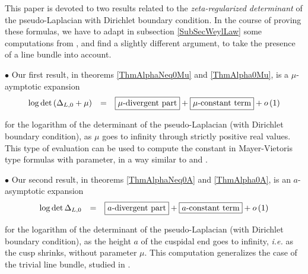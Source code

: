\documentclass{jams-l}
\theoremstyle{definition}
\theoremstyle{remark}
\numberwithin{equation}{section}
\begin{document}
        This paper is devoted to two results related to the \textit{zeta-regularized determinant} of the pseudo-Laplacian with Dirichlet boundary condition. In the course of proving these formulas, we have to adapt in subsection \ref{SubSecWeylLaw} some computations from \cite{MR699488}, and find a slightly different argument, to take the presence of a line bundle into account.
        
        \medskip
        
        \hspace{10pt} $\bullet$ Our first result, in theorems \ref{ThmAlphaNeq0Mu} and \ref{ThmAlpha0Mu}, is a $\mu$-aymptotic expansion
            \begin{equation}
            \label{AsymptoticStudyMu}
                \begin{array}{lll}
                    \log \det \left( \Delta_{L,0} + \mu \right) & = & \fbox{$\mu$-divergent part} + \fbox{$\mu$-constant term} + o \left( 1 \right)
                \end{array}
            \end{equation}
            
            \noindent for the logarithm of the determinant of the pseudo-Laplacian (with Dirichlet boundary condition), as $\mu$ goes to infinity through strictly positive real values. This type of evaluation can be used to compute the constant in Mayer-Vietoris type formulas with parameter, in a way similar to \cite[Sec. 3.19 \& 4.8]{MR1165865} and \cite{MR1890995}.
            
        
        \medskip
        
        \hspace{10pt} $\bullet$ Our second result, in theorems \ref{ThmAlphaNeq0A} and \ref{ThmAlpha0A}, is an $a$-asymptotic expansion
            \begin{equation}
            \label{AsymptoticStudyA}
                \begin{array}{lll}
                    \log \det \Delta_{L,0} & = & \fbox{$a$-divergent part} + \fbox{$a$-constant term} + o \left( 1 \right)
                \end{array}
            \end{equation}
            
            \noindent for the logarithm of the determinant of the pseudo-Laplacian (with Dirichlet boundary condition), as the height $a$ of the cuspidal end goes to infinity, \textit{i.e.} as the cusp shrinks, without parameter $\mu$. This computation generalizes the case of the trivial line bundle, studied in \cite[Sec. 6]{MR4167014}.
    
\end{document}
